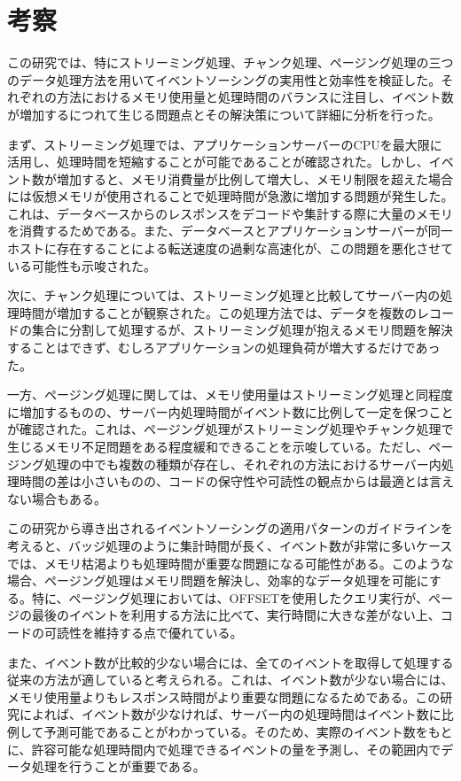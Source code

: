 \documentclass[../../main]{subfiles}
\begin{document}
    \section{考察}\label{sec:consideration}
    この研究では、特にストリーミング処理、チャンク処理、ページング処理の三つのデータ処理方法を用いてイベントソーシングの実用性と効率性を検証した。それぞれの方法におけるメモリ使用量と処理時間のバランスに注目し、イベント数が増加するにつれて生じる問題点とその解決策について詳細に分析を行った。

    まず、ストリーミング処理では、アプリケーションサーバーのCPUを最大限に活用し、処理時間を短縮することが可能であることが確認された。しかし、イベント数が増加すると、メモリ消費量が比例して増大し、メモリ制限を超えた場合には仮想メモリが使用されることで処理時間が急激に増加する問題が発生した。これは、データベースからのレスポンスをデコードや集計する際に大量のメモリを消費するためである。また、データベースとアプリケーションサーバーが同一ホストに存在することによる転送速度の過剰な高速化が、この問題を悪化させている可能性も示唆された。

    次に、チャンク処理については、ストリーミング処理と比較してサーバー内の処理時間が増加することが観察された。この処理方法では、データを複数のレコードの集合に分割して処理するが、ストリーミング処理が抱えるメモリ問題を解決することはできず、むしろアプリケーションの処理負荷が増大するだけであった。

    一方、ページング処理に関しては、メモリ使用量はストリーミング処理と同程度に増加するものの、サーバー内処理時間がイベント数に比例して一定を保つことが確認された。これは、ページング処理がストリーミング処理やチャンク処理で生じるメモリ不足問題をある程度緩和できることを示唆している。ただし、ページング処理の中でも複数の種類が存在し、それぞれの方法におけるサーバー内処理時間の差は小さいものの、コードの保守性や可読性の観点からは最適とは言えない場合もある。

    この研究から導き出されるイベントソーシングの適用パターンのガイドラインを考えると、バッジ処理のように集計時間が長く、イベント数が非常に多いケースでは、メモリ枯渇よりも処理時間が重要な問題になる可能性がある。このような場合、ページング処理はメモリ問題を解決し、効率的なデータ処理を可能にする。特に、ページング処理においては、OFFSETを使用したクエリ実行が、ページの最後のイベントを利用する方法に比べて、実行時間に大きな差がない上、コードの可読性を維持する点で優れている。

    また、イベント数が比較的少ない場合には、全てのイベントを取得して処理する従来の方法が適していると考えられる。これは、イベント数が少ない場合には、メモリ使用量よりもレスポンス時間がより重要な問題になるためである。この研究によれば、イベント数が少なければ、サーバー内の処理時間はイベント数に比例して予測可能であることがわかっている。そのため、実際のイベント数をもとに、許容可能な処理時間内で処理できるイベントの量を予測し、その範囲内でデータ処理を行うことが重要である。
\end{document}
